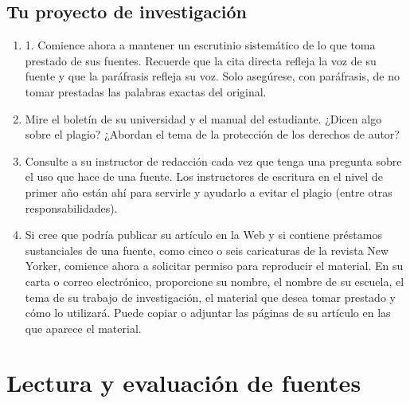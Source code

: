 \section{Tu proyecto de investigación}
\begin{enumerate}[1.]
    \item 1. Comience ahora a mantener un escrutinio sistemático de lo que toma prestado de sus fuentes. Recuerde que la cita directa refleja la voz de su fuente y que la paráfrasis refleja su voz. Solo asegúrese, con paráfrasis, de no tomar prestadas las palabras exactas del original.  
    \item Mire el boletín de su universidad y el manual del estudiante. ¿Dicen algo sobre el plagio? ¿Abordan el tema de la protección de los derechos de autor? 
    \item Consulte a su instructor de redacción cada vez que tenga una pregunta sobre el uso que hace de una fuente. Los instructores de escritura en el nivel de primer año están ahí para servirle y ayudarlo a evitar el plagio (entre otras responsabilidades). 
    \item Si cree que podría publicar su artículo en la Web y si contiene préstamos sustanciales de una fuente, como cinco o seis caricaturas de la revista New Yorker, comience ahora a solicitar permiso para reproducir el material. En su carta o correo electrónico, proporcione su nombre, el nombre de su escuela, el tema de su trabajo de investigación, el material que desea tomar prestado y cómo lo utilizará. Puede copiar o adjuntar las páginas de su artículo en las que aparece el material.
\end{enumerate}



\chapter{Lectura y evaluación de fuentes}
